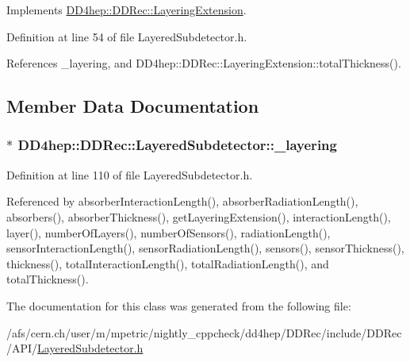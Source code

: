 Implements \hyperlink{class_d_d4hep_1_1_d_d_rec_1_1_layering_extension_a287dd58b108f5d121bc55c91009454ed}{DD4hep::DDRec::LayeringExtension}.

Definition at line 54 of file LayeredSubdetector.h.

References \_\-layering, and DD4hep::DDRec::LayeringExtension::totalThickness().

\subsection{Member Data Documentation}
\hypertarget{class_d_d4hep_1_1_d_d_rec_1_1_layered_subdetector_a01f66cc99e59bf522dff6c7295235692}{
\subsubsection[{\_\-layering}]{$\ast$ {\bf DD4hep::DDRec::LayeredSubdetector::\_\-layering}}}
\label{class_d_d4hep_1_1_d_d_rec_1_1_layered_subdetector_a01f66cc99e59bf522dff6c7295235692}


Definition at line 110 of file LayeredSubdetector.h.

Referenced by absorberInteractionLength(), absorberRadiationLength(), absorbers(), absorberThickness(), getLayeringExtension(), interactionLength(), layer(), numberOfLayers(), numberOfSensors(), radiationLength(), sensorInteractionLength(), sensorRadiationLength(), sensors(), sensorThickness(), thickness(), totalInteractionLength(), totalRadiationLength(), and totalThickness().

The documentation for this class was generated from the following file:\begin{DoxyCompactItemize}
\item 
/afs/cern.ch/user/m/mpetric/nightly\_\-cppcheck/dd4hep/DDRec/include/DDRec/API/\hyperlink{_layered_subdetector_8h}{LayeredSubdetector.h}\end{DoxyCompactItemize}
